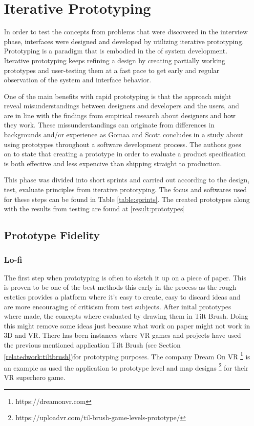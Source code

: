 \section{Iterative Prototyping}
\label{method:prototype}
In order to test the concepts from problems that were discovered in the interview phase, interfaces were designed and developed by utilizing iterative prototyping. Prototyping is a paradigm that is embodied in the  of system development\cite{proto:Gomaa1981}. Iterative prototyping keeps refining a design by creating partially working prototypes and user-testing them at a fast pace to get early and regular observation of the system and interface behavior\cite{proto:hartson2012ux}.

One of the main benefits with rapid prototyping is that the approach might reveal misunderstandings between designers and developers and the users, and are in line with the findings from empirical research about designers and how they work\cite{proto:tripp1990rapid}. These missunderstandings can originate from differences in backgrounds and/or experience as Gomaa and Scott concludes in a study about using prototypes throughout a software development process.\cite{proto:Lichter1993} The authors goes on to state that creating a prototype in order to evaluate a product specification is both effective and less expencive than shipping straight to production.

This phase was divided into short sprints and carried out according to the design, test, evaluate principles from iterative prototyping.\cite{proto:hartson2012ux} The focus and softwares used for these steps can be found in Table \ref{table:sprints}. The created prototypes along with the results from testing are found at \ref{result:prototypes}
\subsection{Prototype Fidelity}
\subsubsection{Lo-fi}
\label{method:prototype:lofi}
The first step when prototyping is often to sketch it up on a piece of paper. This is proven to be one of the best methods this early in the process as the rough estetics provides a platform where it's easy to create, easy to discard ideas and are more encouraging of critisism from test subjects. \cite{proto:boling1997holistic} After inital prototypes where made, the concepts where evaluated by drawing them in Tilt Brush. Doing this might remove some ideas just because what work on paper might not work in 3D and VR. There has been instances where VR games and projects have used the previous mentioned application Tilt Brush (see Section \ref{relatedwork:tiltbrush})for prototyping purposes. The company Dream On VR \footnote{https://dreamonvr.com} is an example as used the application to prototype level and map designs \footnote{https://uploadvr.com/til-brush-game-levels-prototype/} for their VR superhero game.

